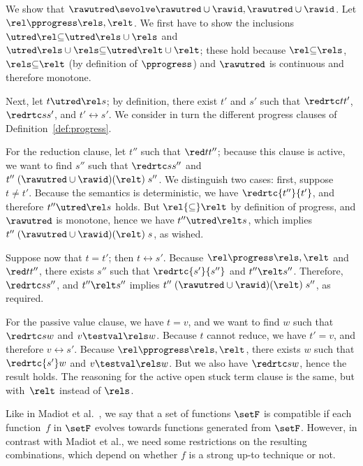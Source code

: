 \documentclass{lmcs}
\theoremstyle{defC}
\begin{document}
\begin{exa}%
  \label{ex:red-sevolve}
  We show that
  $\rawutred \sevolve \rawutred \cup \rawid, \rawutred \cup \rawid$. Let
  $\rel \pprogress \rels, \relt$. We first have to show the inclusions
  $\utred\rel \mathord{\subseteq} \utred\rels \cup \rels$ and
  $\utred\rels \cup \rels \mathord{\subseteq} \utred\relt \cup \relt$; these
  hold because $\rel \mathord{\subseteq} \rels$,
  $\rels \mathord{\subseteq} \relt$ (by definition of $\pprogress$) and
  $\rawutred$ is continuous and therefore monotone.

  Next, let $t \utred \rel s$; by definition, there exist $t'$ and $s'$ such
  that $\redrtc t {t'}$, $\redrtc s {s'}$, and $t' \rel s'$. We consider in turn
  the different progress clauses of Definition~\ref{def:progress}.

  For the reduction clause, let $t''$ such that $\red t {t''}$; because this
  clause is active, we want to find $s''$ such that $\redrtc s {s''}$ and
  $t'' \mathrel{(\rawutred \cup \rawid)(\relt)} s''$. We distinguish two cases:
  first, suppose $t \neq t'$. Because the semantics is deterministic, we have
  $\redrtc {t''}{t'}$, and therefore $t'' \utred \rel s$ holds. But
  $\rel {\mathord{\subseteq}} \relt$ by definition of progress, and $\rawutred$
  is monotone, hence we have $t'' \utred \relt s$, which implies
  $t'' \mathrel{(\rawutred \cup \rawid)(\relt)} s$, as wished.

  Suppose now that $t = t'$; then $t \rel s'$. Because $\rel \progress \rels,
  \relt$ and $\red t {t''}$, there exists $s''$ such that $\redrtc {s'}{s''}$
  and $t'' \relt s''$. Therefore, $\redrtc s {s''}$, and $t'' \relt s''$ implies
  $t'' \mathrel{(\rawutred \cup \rawid)(\relt)} s''$, as required.

  For the passive value clause, we have $t = v$, and we want to find $w$ such
  that $\redrtc s w$ and $v \testval \rels w$. Because $t$ cannot reduce, we
  have $t'=v$, and therefore $v \rel s'$. Because $\rel \pprogress \rels,
  \relt$, there exists $w$ such that $\redrtc {s'} w$ and $v \testval \rels
  w$. But we also have $\redrtc s w$, hence the result holds. The reasoning for
  the active open stuck term clause is the same, but with~$\relt$ instead of
  $\rels$.
\end{exa}

Like in Madiot et al.~\cite{Madiot-al:CONCUR14}, we say that a set of functions
$\setF$ is compatible if each function~$f$ in $\setF$ evolves towards functions
generated from $\setF$. However, in contrast with Madiot et al., we need some
restrictions on the resulting combinations, which depend on whether $f$ is a
strong up-to technique or not.
\end{document}
